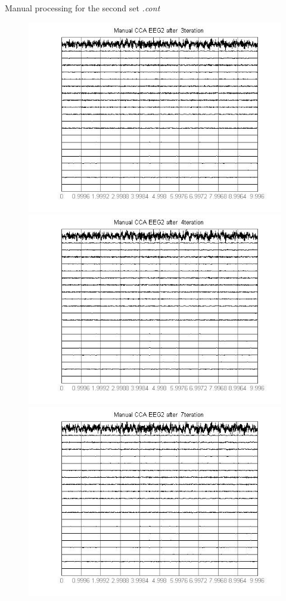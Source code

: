 \documentclass[t,12pt,english
\ifx\beamermode\undefined\else,\beamermode\fi
]{beamer}
\begin{document}
\begin{frame}{Manual processing  for the second set \textit{.cont}}

\begin{figure}[!htbp]
%
\centering
\includegraphics[width=1\textwidth]{17.jpg}\\
\includegraphics[width=1\textwidth]{18.jpg}
\endminipage\hfill
{}%
\centering
\includegraphics[width=1\textwidth]{21.jpg}\\

\end{figure}
\end{frame}
\end{document}
